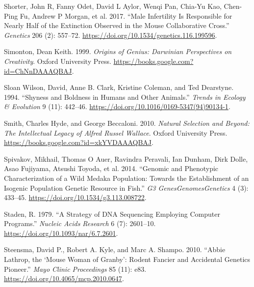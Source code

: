 \documentclass[
]{book}
\newlength{\cslhangindent}
\newlength{\cslentryspacingunit} %
\newenvironment{CSLReferences}[2] %
 {%
  \setlength{\parindent}{0pt}
  \ifodd #1
  \let\oldpar\par
  \def\par{\hangindent=\cslhangindent\oldpar}
  \fi
  \setlength{\parskip}{#2\cslentryspacingunit}
 }%
 {}
\begin{document}
\begin{CSLReferences}{1}{0}
\leavevmode{}%
Shorter, John R, Fanny Odet, David L Aylor, Wenqi Pan, Chia-Yu Kao, Chen-Ping Fu, Andrew P Morgan, et al. 2017. {``Male {Infertility Is Responsible} for {Nearly Half} of the {Extinction Observed} in the {Mouse Collaborative Cross}.''} \emph{Genetics} 206 (2): 557--72. \url{https://doi.org/10.1534/genetics.116.199596}.

\leavevmode{}%
Simonton, Dean Keith. 1999. \emph{Origins of {Genius}: {Darwinian Perspectives} on {Creativity}}. {Oxford University Press}. \url{https://books.google.com?id=ChNnDAAAQBAJ}.

\leavevmode{}%
Sloan Wilson, David, Anne B. Clark, Kristine Coleman, and Ted Dearstyne. 1994. {``Shyness and Boldness in Humans and Other Animals.''} \emph{Trends in Ecology \& Evolution} 9 (11): 442--46. \url{https://doi.org/10.1016/0169-5347(94)90134-1}.

\leavevmode{}%
Smith, Charles Hyde, and George Beccaloni. 2010. \emph{Natural {Selection} and {Beyond}: {The Intellectual Legacy} of {Alfred Russel Wallace}}. {Oxford University Press}. \url{https://books.google.com?id=xkYVDAAAQBAJ}.

\leavevmode{}%
Spivakov, Mikhail, Thomas O Auer, Ravindra Peravali, Ian Dunham, Dirk Dolle, Asao Fujiyama, Atsushi Toyoda, et al. 2014. {``Genomic and {Phenotypic Characterization} of a {Wild Medaka Population}: {Towards} the {Establishment} of an {Isogenic Population Genetic Resource} in {Fish}.''} \emph{G3 Genes\textbar Genomes\textbar Genetics} 4 (3): 433--45. \url{https://doi.org/10.1534/g3.113.008722}.

\leavevmode{}%
Staden, R. 1979. {``A Strategy of {DNA} Sequencing Employing Computer Programs.''} \emph{Nucleic Acids Research} 6 (7): 2601--10. \url{https://doi.org/10.1093/nar/6.7.2601}.

\leavevmode{}%
Steensma, David P., Robert A. Kyle, and Marc A. Shampo. 2010. {``Abbie {Lathrop}, the {`{Mouse Woman} of {Granby}'}: {Rodent Fancier} and {Accidental Genetics Pioneer}.''} \emph{Mayo Clinic Proceedings} 85 (11): e83. \url{https://doi.org/10.4065/mcp.2010.0647}.


\end{CSLReferences}
\end{document}
